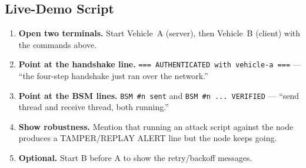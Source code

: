 \documentclass[11pt,a4paper]{report}
\begin{document}
\subsection{Live-Demo Script}
\begin{enumerate}
  \item \textbf{Open two terminals.} Start Vehicle~A (server), then Vehicle~B
        (client) with the commands above.
  \item \textbf{Point at the handshake line.} \texttt{=== AUTHENTICATED with
        vehicle-a ===} --- ``the four-step handshake just ran over the network.''
  \item \textbf{Point at the BSM lines.} \texttt{BSM \#n sent} and \texttt{BSM
        \#n ... VERIFIED} --- ``send thread and receive thread, both running.''
  \item \textbf{Show robustness.} Mention that running an attack script against
        the node produces a TAMPER/REPLAY ALERT line but the node keeps going.
  \item \textbf{Optional.} Start B before A to show the retry/backoff messages.
\end{enumerate}
\end{document}
